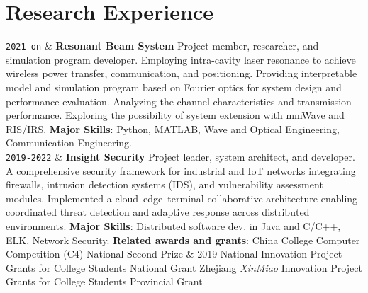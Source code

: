 \documentclass[9pt,a4paper]{article}
\newcommand{\Duration}[2]{\fontsize{10pt}{0}\selectfont \texttt{#1-#2}}
\newcommand{\Ongoing}{on}
\newcommand{\Website}[1]{\href{https://#1}{#1}}
\begin{document}
\section{Research Experience}

\begin{EntriesTableDuration}
  \Duration{2021}{\Ongoing} &
  \textbf{Resonant Beam System} %
  \hfill Project member, researcher, and simulation program developer.
  \newline
  Employing intra-cavity laser resonance to achieve wireless power transfer, communication, and positioning. 
  \newline Providing interpretable model and simulation program based on Fourier optics for system design and performance evaluation.
  \newline Analyzing the channel characteristics and transmission performance.
  \newline Exploring the possibility of system extension with mmWave and RIS/IRS.
  \newline \textbf{Major Skills}: Python, MATLAB, Wave and Optical Engineering, Communication Engineering.
  \\

  \Duration{2019}{2022} &
  \textbf{Insight Security} \hfill Project leader, system architect, and developer.
  \newline
  A comprehensive security framework for industrial and IoT networks integrating firewalls, intrusion detection systems (IDS), and vulnerability assessment modules.
	\newline
  Implemented a cloud–edge–terminal collaborative architecture enabling coordinated threat detection and adaptive response across distributed environments.
	\newline \textbf{Major Skills}: Distributed software dev. in Java and C/C++, ELK, Network Security.
  \newline 
  \textbf{Related awards and grants}:
   China College Computer Competition (C4) 
  \hfill National Second Prize 
   \& 2019 National Innovation Project Grants for College Students
  \hfill National Grant
   Zhejiang \emph{XinMiao} Innovation Project Grants for College Students
  \hfill Provincial Grant
  \\

\end{EntriesTableDuration}
\end{document}
